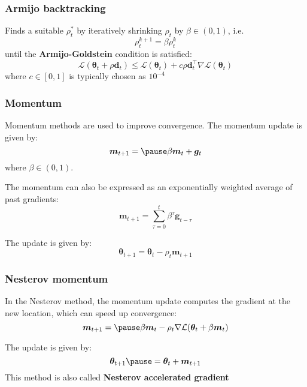 \documentclass[smaller]{beamer}
\newcommand{\?}{\stackrel{?}{=}}
\renewcommand{\th}{\theta}
\newcommand{\mc}{\mathcal}
\newcommand{\tr}{^{\top}}
\newcommand{\pe}{\pause}
\begin{document}
  \begin{frame}
    \frametitle{Armijo backtracking}
    Finds a suitable $\rho_{t}^{*}$ by iteratively shrinking $\rho_{t}$ by $\beta \in (0,1)$, i.e.\pe
    \begin{equation}
      \rho_{t}^{k+1} = \beta\rho_{t}^{k}
    \end{equation}
    until the \textbf{Armijo-Goldstein} condition is satisfied: \pe
    \begin{equation}
      \mc{L}(\bm\th_{t} + \rho\bm d_{t}) \le \mc{L}(\bm\th_{t}) + c\rho\bm d_{t}\tr\nabla\mc{L}(\bm\th_{t})
    \end{equation}
    \pe
    where $c \in [0,1]$ is typically chosen as $10^{-4}$
\end{frame}

\begin{frame}
  \frametitle{Momentum}
  \pe
  Momentum methods are used to improve convergence. \pe The momentum update is given by:\pe
  \begin{equation}
    \bm m_{t+1} = \pe \beta\bm m_{t} + \bm g_{t}
  \end{equation}
  \pe where $\beta \in (0,1)$. \pe

 
  The momentum can also be expressed as an exponentially weighted average of past gradients:  \pe
  \begin{equation}
    \bm m_{t+1} = \sum_{\tau = 0}^{t}\beta^\tau\bm g_{t-\tau}
  \end{equation}
  \pe

   The update is given by:\pe
  \begin{equation}
    \bm\th_{t+1} = \bm\th_{t} - \rho_{t}\bm m_{t+1}
  \end{equation}
 
\end{frame}

\begin{frame}
  \frametitle{Nesterov momentum}
  \pe
  In the Nesterov method, the momentum update computes the gradient at the new location, which can speed up convergence:
  \begin{equation}
    \bm m_{t+1} = \pe \beta\bm m_{t} - \rho_t\nabla\mc{L}(\bm\th_t+\beta \bm m_{t})
  \end{equation}
  \pe

  The update is given by: \pe
  \begin{equation}
    \bm\th_{t+1} \pe = \bm\th_t+\bm m_{t+1}
  \end{equation}
  \pe
  This method is also called \textbf{Nesterov accelerated gradient}
\end{frame}
\end{document}

